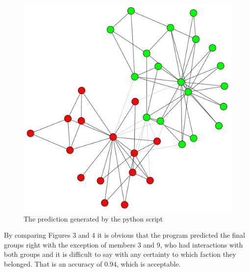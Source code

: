 \documentclass{article}
\begin{document}
\begin{figure}[H]
 \centering
 	\includegraphics[height=10 cm]{prediction.pdf}
  \caption{The prediction generated by the python script}
\end{figure}

By comparing Figures 3 and 4 it is obvious that the program predicted the final groups right with the exception of members 3 and 9, who had interactions with both groups and it is difficult to say with any certainty to which faction they belonged. That is an accuracy of 0.94, which is acceptable. 


\end{document}
